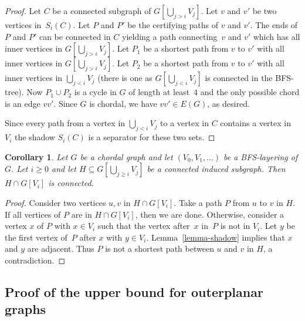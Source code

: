 \documentclass[11pt]{article}
\newtheorem{corollary}[theorem]{Corollary}
\begin{document}
\begin{proof}
  Let $C$ be a connected subgraph of $G[\bigcup_{j> i} V_j]$.  Let $v$
  and $v'$ be two vertices in~$S_i(C)$.  Let $P$ and $P'$ be the
  certifying paths of $v$ and $v'$. The ends of $P$ and $P'$ can be
  connected in $C$ yielding a path connecting~$v$ and $v'$ which has
  all inner vertices in $G[\bigcup_{j> i} V_j]$. Let $P_1$ be a
  shortest path from $v$ to $v'$ with all inner vertices in
  $G[\bigcup_{j> i} V_j]$. Let $P_2$ be a shortest path from $v$ to
  $v'$ with all inner vertices in $\bigcup_{j< i} V_j$ (there is one
  as $G\left[\bigcup_{j< i} V_j\right]$ is connected in the BFS-tree).
  Now $P_1 \cup P_2$ is a cycle in $G$ of length at least~$4$ and the
  only possible chord is an edge $vv'$.  Since $G$ is chordal, we have
  $vv'\in E(G)$, as desired.

  Since every path from a vertex in $\bigcup_{j< i} V_j$ to a vertex
  in $C$ contains a vertex in $V_i$ the shadow $S_i(C)$ is a separator
  for these two sets.
\end{proof}

\begin{corollary}
  Let $G$ be a chordal graph and let $(V_0,V_1,\ldots)$ be a BFS-layering of
  $G$. Let $i\geq0$ and let $H\subseteq G[\bigcup_{j\geq i} V_j]$ be a
  connected induced subgraph. Then $H\cap G[V_i]$ is connected.
	\label{Cor:shadow}
\end{corollary}
\begin{proof}
  Consider two vertices $u,v$ in $H\cap G[V_i]$.  Take a path $P$ from $u$ to
  $v$ in $H$.  If all vertices of $P$ are in $H\cap G[V_i]$, then we are done.
  Otherwise, consider a vertex $x$ of $P$ with $x\in V_i$ such that the vertex
  after~$x$ in~$P$ is not in $V_i$.  Let $y$ be the first vertex of~$P$ after
  $x$ with $y\in V_i$. Lemma~\ref{lemma-shadow} implies that $x$ and $y$ are
  adjacent. Thus $P$ is not a shortest path between $u$ and $v$ in $H$, a
  contradiction.
\end{proof}

\subsection{Proof of the upper bound for outerplanar graphs}\hfill
	
\end{document}
